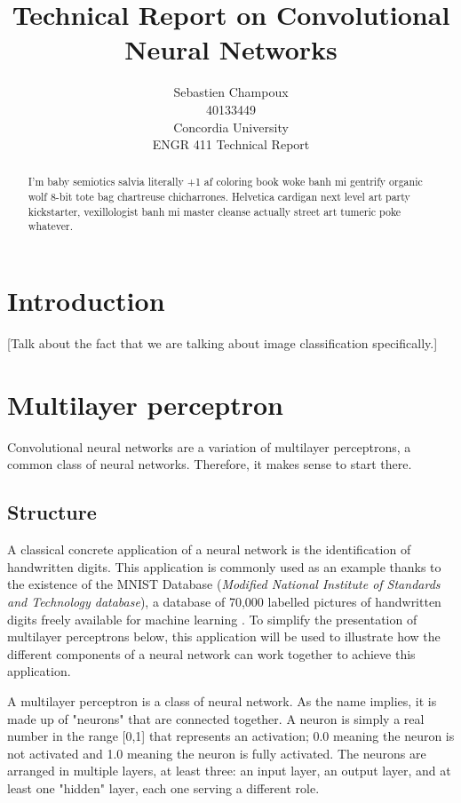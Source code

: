 \documentclass[12pt,a4paper,notitlepage]{article}
\begin{document}
\title{Technical Report on Convolutional Neural Networks}
\author{Sebastien Champoux
\\ 40133449
\\ Concordia University
\\ ENGR 411 Technical Report
}
\maketitle

\begin{abstract}
I'm baby semiotics salvia literally +1 af coloring book woke banh mi gentrify organic wolf 8-bit tote bag chartreuse chicharrones. Helvetica cardigan next level art party kickstarter, vexillologist banh mi master cleanse actually street art tumeric poke whatever.
\end{abstract}
\clearpage

\tableofcontents
\clearpage

\listoffigures
\clearpage

\section{Introduction}
[Talk about the fact that we are talking about image classification specifically.]

\section{Multilayer perceptron}\label{multilayer-perceptron}
Convolutional neural networks are a variation of multilayer perceptrons, a common class of neural networks. Therefore, it makes sense to start there.

\subsection{Structure}
A classical concrete application of a neural network is the identification of handwritten digits. This application is commonly used as an example thanks to the existence of the MNIST Database (\textit{Modified National Institute of Standards and Technology database}), a database of 70,000 labelled pictures of handwritten digits freely available for machine learning \cite{lecun_mnist_1998}. To simplify the presentation of multilayer perceptrons below, this application will be used to illustrate how the different components of a neural network can work together to achieve this application.

A multilayer perceptron is a class of neural network. As the name implies, it is made up of "neurons" that are connected together. A neuron is simply a real number in the range [0,1] that represents an activation; 0.0 meaning the neuron is not activated and 1.0 meaning the neuron is fully activated. The neurons are arranged in multiple layers, at least three: an input layer, an output layer, and at least one "hidden" layer, each one serving a different role.
\end{document}
